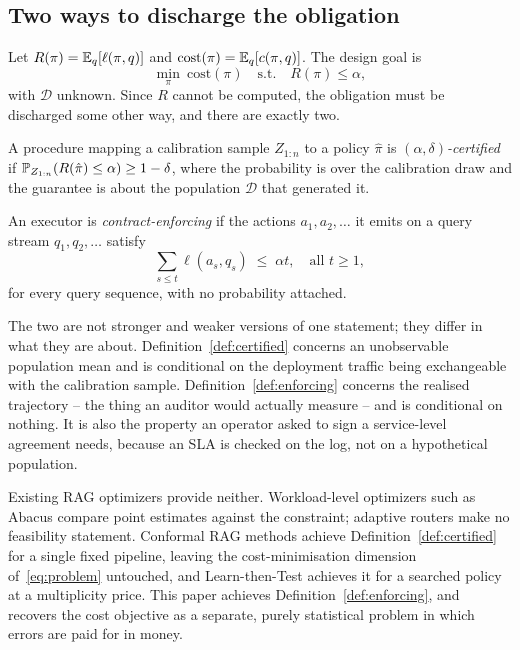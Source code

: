 \subsection{Two ways to discharge the obligation}

Let $R(\pi) = \mathbb{E}_{q}[\ell(\pi,q)]$ and
$\mathrm{cost}(\pi) = \mathbb{E}_{q}[c(\pi,q)]$. The design goal is
\begin{equation}
\label{eq:problem}
\min_{\pi} \ \mathrm{cost}(\pi)
\quad \text{s.t.} \quad R(\pi) \le \alpha ,
\end{equation}
with $\mathcal{D}$ unknown. Since $R$ cannot be computed, the
obligation must be discharged some other way, and there are exactly two.

\begin{definition}
\label{def:certified}
A procedure mapping a calibration sample $Z_{1:n}$ to a policy
$\hat\pi$ is \emph{$(\alpha,\delta)$-certified} if
$\mathbb{P}_{Z_{1:n}}( R(\hat\pi) \le \alpha ) \ge 1-\delta$,
where the probability is over the calibration draw and the guarantee is
about the population $\mathcal{D}$ that generated it.
\end{definition}

\begin{definition}
\label{def:enforcing}
An executor is \emph{contract-enforcing} if the actions
$a_1, a_2, \dots$ it emits on a query stream
$q_1, q_2, \dots$ satisfy
\[
\textstyle\sum_{s \le t} \ell(a_s, q_s) \;\le\; \alpha t ,
\quad \text{all } t \ge 1 ,
\]
for every query sequence, with no probability attached.
\end{definition}

The two are not stronger and weaker versions of one statement; they
differ in what they are about. Definition~\ref{def:certified} concerns
an unobservable population mean and is conditional on the deployment
traffic being exchangeable with the calibration sample.
Definition~\ref{def:enforcing} concerns the realised trajectory --
the thing an auditor would actually measure -- and is conditional on
nothing. It is also the property an operator asked to sign a
service-level agreement needs, because an SLA is checked on the log,
not on a hypothetical population.

Existing RAG optimizers provide neither. Workload-level optimizers such
as Abacus \citep{russo2025abacus} compare point estimates against the
constraint; adaptive routers \citep{jeong2024adaptiverag} make no
feasibility statement. Conformal RAG methods
\citep{li2024traq,kang2024crag} achieve Definition~\ref{def:certified}
for a single fixed pipeline, leaving the cost-minimisation dimension
of~\eqref{eq:problem} untouched, and Learn-then-Test
\citep{angelopoulos2021ltt} achieves it for a searched policy at a
multiplicity price. This paper achieves
Definition~\ref{def:enforcing}, and recovers the cost objective as a
separate, purely statistical problem in which errors are paid for in
money.

